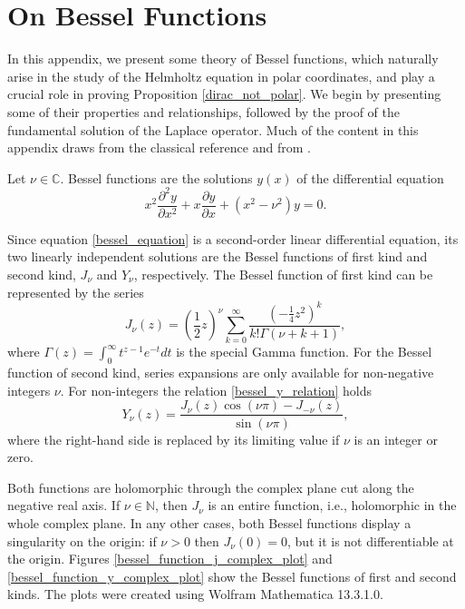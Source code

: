 \chapter{On Bessel Functions}\label{appendix_c_bessel}

In this appendix, we present some theory of Bessel functions, which naturally arise in the study of the Helmholtz equation in polar coordinates, and play a crucial role in proving Proposition \ref{dirac_not_polar}. We begin by presenting some of their properties and relationships, followed by the proof of the fundamental solution of the Laplace operator. Much of the content in this appendix draws from the classical reference \cite{abramowitz1988handbook} and from \cite{chen2010boundary}.

Let \(\nu \in \mathbb{C}\). Bessel functions are the solutions \(y(x)\) of the differential equation
\begin{equation}\label{bessel_equation}
    x^2\frac{\partial^2 y}{\partial x^2} + x \frac{\partial y}{\partial x} + (x^2-\nu^2)y = 0.
\end{equation}

Since equation \eqref{bessel_equation} is a second-order linear differential equation, its two linearly independent solutions are the Bessel functions of first kind and second kind, \(J_\nu\) and \(Y_\nu\), respectively. The Bessel function of first kind can be represented by the series
\[
    J_\nu (z) = \left(\frac{1}{2}z\right)^\nu \sum_{k=0}^{\infty} \frac{\left(-\frac{1}{4}z^2\right)^k}{k! \Gamma(\nu+k+1)},
\]
where \(\Gamma(z) = \int_0^\infty t^{z-1} e^{-t}dt\) is the special Gamma function. For the Bessel function of second kind, series expansions are only available for non-negative integers \(\nu\). For non-integers the relation \eqref{bessel_y_relation} holds
\begin{equation}\label{bessel_y_relation}
    Y_\nu(z) = \frac{J_\nu(z) \cos(\nu \pi) - J_{-\nu}(z)}{\sin(\nu \pi)},
\end{equation}
where the right-hand side is replaced by its limiting value if \(\nu\) is an integer or zero.

Both functions are holomorphic through the complex plane cut along the negative real axis. If \(\nu \in \mathbb{N}\), then \(J_\nu\) is an entire function, i.e., holomorphic in the whole complex plane. In any other cases, both Bessel functions display a singularity on the origin: if \(\nu > 0\) then \(J_\nu(0)=0\), but it is not differentiable at the origin. Figures \ref{bessel_function_j_complex_plot} and \ref{bessel_function_y_complex_plot} show the Bessel functions of first and second kinds. The plots were created using Wolfram Mathematica 13.3.1.0.

